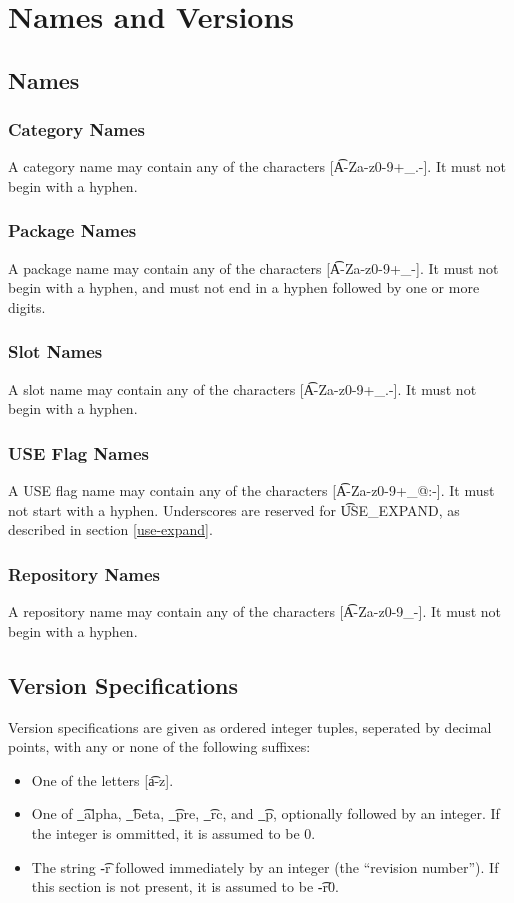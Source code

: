 \chapter{Names and Versions}

\section{Names}
\subsection{Category Names}
A category name may contain any of the characters [\t{A-Za-z0-9+\_.-}]. It must not begin with
a hyphen.

\subsection{Package Names}
A package name may contain any of the characters [\t{A-Za-z0-9+\_-}]. It must not begin with a
hyphen, and must not end in a hyphen followed by one or more digits.

\subsection{Slot Names}
A slot name may contain any of the characters [\t{A-Za-z0-9+\_.-}]. It must not begin with a
hyphen.

\subsection{USE Flag Names}
A USE flag name may contain any of the characters [\t{A-Za-z0-9+\_@:-}]. It must not start with
a hyphen. Underscores are reserved for \t{USE\_EXPAND}, as described in section
\ref{use-expand}.

\subsection{Repository Names}
\label{repository-names}
A repository name may contain any of the characters [\t{A-Za-z0-9\_-}]. It must not begin with a
hyphen.

\section{Version Specifications}
Version specifications are given as ordered integer tuples, seperated by decimal points, with any or
none of the following suffixes:
\begin{itemize}
\item One of the letters [\t{a-z}].
\item One of \t{\_alpha}, \t{\_beta}, \t{\_pre}, \t{\_rc}, and \t{\_p}, optionally followed by an
    integer. If the integer is ommitted, it is assumed to be 0.
\item The string \t{-r} followed immediately by an integer (the ``revision number''). If this section
    is not present, it is assumed to be \t{-r0}.
\end{itemize}

